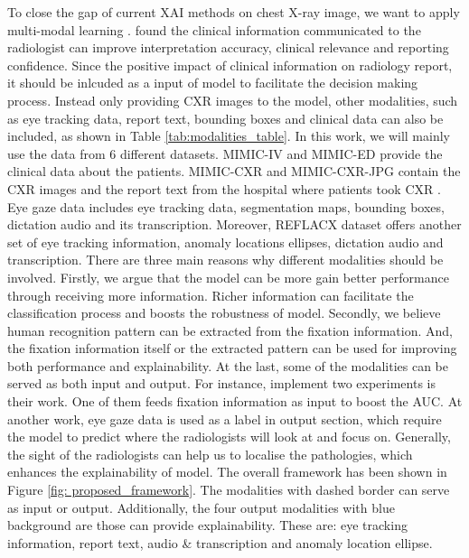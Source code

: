 To close the gap of current XAI methods on chest X-ray image, we want to apply multi-modal learning \citep{Ngiam2011MultiModalLearning}.  \citet{Castillo2020ClinicalInformationOnRadiology} found the clinical information communicated to the radiologist can improve interpretation accuracy, clinical relevance and reporting confidence. Since the positive impact of clinical information on radiology report, it should be inlcuded as a input of model to facilitate the decision making process. Instead only providing CXR images to the model, other modalities, such as eye tracking data, report text, bounding boxes and clinical data can also be included, as shown in Table \ref{tab:modalities_table}. In this work, we will mainly use the data from 6 different datasets. MIMIC-IV \citep{Johnson2021MIMIC_IV} and MIMIC-ED \citep{Johnson2021MIMIC_IV_ED} provide the clinical data about the patients. MIMIC-CXR \citep{Johnson2019MIMIC_CXR} and MIMIC-CXR-JPG \citep{DJohnson2019MIMIC_CXR_JPG} contain the CXR images and the report text from the hospital where patients took CXR . Eye gaze data \citep{Karargyris2020EyeGazeDataset} includes eye tracking data, segmentation maps, bounding boxes, dictation audio and its transcription. Moreover, REFLACX dataset \citep{Lanfredi2021REFLACX} offers another set of eye tracking information, anomaly locations ellipses, dictation audio and transcription. There are three main reasons why different modalities should be involved. Firstly, we argue that the model can be more gain better performance through receiving more information. Richer information can facilitate the classification process and boosts the robustness of model. Secondly, we believe human recognition pattern can be extracted from the fixation information. And, the fixation information itself or the extracted pattern can be used for improving both performance and explainability. At the last, some of the modalities can be served as both input and output. For instance, \citet{Karargyris2021EyeGazePaper} implement two experiments is their work. One of them feeds fixation information as input to boost the AUC. At another work, eye gaze data is used as a label in output section, which require the model to predict where the radiologists will look at and focus on. Generally, the sight of the radiologists can help us to localise the pathologies, which enhances the explainability of model. The overall framework has been shown in Figure \ref{fig: proposed_framework}. The modalities with dashed border can serve as input or output. Additionally, the four output modalities with blue background are those can provide explainability. These are: eye tracking information, report text, audio \& transcription and anomaly location ellipse.\\

